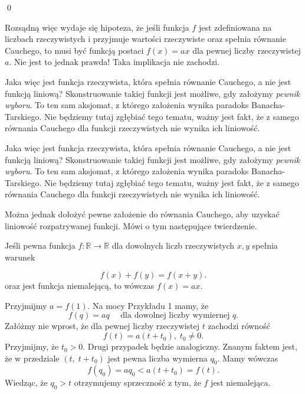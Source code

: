 \qed

\noindent
Rozsądną więc wydaje się hipoteza, że jeśli funkcja $f$ jest zdefiniowana na liczbach rzeczywistych i przyjmuje wartości rzeczywiste oraz spełnia równanie Cauchego, to musi być funkcją postaci $f(x) = ax$ dla pewnej liczby rzeczywistej $a$. Nie jest to jednak prawda! Taka implikacja nie zachodzi.

\vspace{10px}

\noindent
Jaka więc jest funkcja rzeczywista, która spełnia równanie Cauchego, a nie jest funkcją liniową? Skonstruowanie takiej funkcji jest możliwe, gdy założymy \textit{pewnik wyboru}. To ten sam aksjomat, z którego założenia wynika  paradoks Banacha-Tarskiego. Nie będziemy tutaj zgłębiać tego tematu, ważny jest fakt, że z samego równania Cauchego dla funkcji rzeczywistych nie wynika ich liniowość.

\vspace{10px}

\noindent
Jaka więc jest funkcja rzeczywista, która spełnia równanie Cauchego, a nie jest funkcją liniową? Skonstruowanie takiej funkcji jest możliwe, gdy założymy \textit{pewnik wyboru}. To ten sam aksjomat, z którego założenia wynika  paradoks Banacha-Tarskiego. Nie będziemy tutaj zgłębiać tego tematu, ważny jest fakt, że z samego równania Cauchego dla funkcji rzeczywistych nie wynika ich liniowość.

\vspace{10px}

\noindent
Można jednak dołożyć pewne założenie do równania Cauchego, aby uzyskać liniowość rozpatrywanej funkcji. Mówi o tym następujące twierdzenie.

\vspace{10px}


\noindent
Jeśli pewna funkcja $f:\mathbb{R}\longrightarrow\mathbb{R}$ dla dowolnych liczb rzeczywistych $x, y$ spełnia warunek

\[
	f(x) + f(y) = f(x + y).
\]
oraz jest funkcja niemalejącą, to wówczas $f(x) = ax$.

\vspace{10px}


\noindent
Przyjmijmy $a = f(1)$. Na mocy Przykładu 1 mamy, że 
\[
	f(q) = aq \quad \text{ dla dowolnej liczby wymiernej } q.
\]
Załóżmy nie wprost, że dla pewnej liczby rzeczywistej $t$ zachodzi równość
\[
	f(t) = a(t + t_0), \; t_0 \neq 0.
\]
Przyjmijmy, że $t_0 > 0$. Drugi przypadek będzie analogiczny.
Znanym faktem jest, że w przedziale $(t, \; t + t_0)$ jest pewna liczba wymierna $q_0$. Mamy wówczas
\[
	f(q_0) = aq_0 < a(t + t_0) = f(t).
\]
Wiedząc, że $q_0 > t$ otrzymujemy sprzeczność z tym, że $f$ jest niemalejąca.


